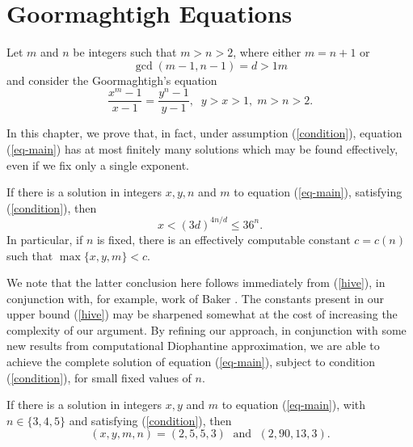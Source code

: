 
\chapter{Goormaghtigh Equations}
\label{ch:Goormaghtigh} 

Let $m$ and $n$ be integers such that $m > n > 2$, where either $m=n+1$ or
 \begin{equation} \label{condition}
 \gcd (m-1,n-1) = d > 1m
 \end{equation}
 and consider the Goormaghtigh's equation
\begin{equation} \label{eq-main}
\frac{x^m-1}{x-1} = \frac{y^n-1}{y-1}, \; \; y>x>1, \; m > n > 2.
\end{equation}
 
In this chapter, we prove that, in fact, under assumption (\ref{condition}), equation (\ref{eq-main}) has at most finitely many solutions which may be found effectively, even if we fix only a single exponent.
\begin{theorem} \label{main-thm}
If there is a solution in integers $x,y, n$ and $m$ to equation (\ref{eq-main}), satisfying (\ref{condition}), then
\begin{equation} \label{hive}
x <  (3d)^{4n/d} \leq  36^n.
\end{equation}
In particular, if $n$ is fixed, there is an effectively computable constant $c=c(n)$ such that
$\max \{ x, y, m \} < c$.
\end{theorem}
We note that the latter conclusion here follows immediately from (\ref{hive}), in conjunction with, for example, work of Baker \cite{Bak}.
The constants present in our upper bound (\ref{hive}) may be sharpened somewhat at the cost of increasing the complexity of our argument. By refining our approach, in conjunction with some new results from computational Diophantine approximation, we are able to achieve the complete solution of equation (\ref{eq-main}), subject to condition (\ref{condition}),  for small fixed values of $n$.

\begin{theorem} \label{main-thm2}
If there is a solution in integers $x,y$ and $m$ to equation (\ref{eq-main}), with $n \in \{ 3, 4, 5 \}$ and satisfying (\ref{condition}), then
$$
(x,y,m,n) = (2,5,5,3)  \; \mbox{ and } \; (2,90,13,3).
$$
\end{theorem}

